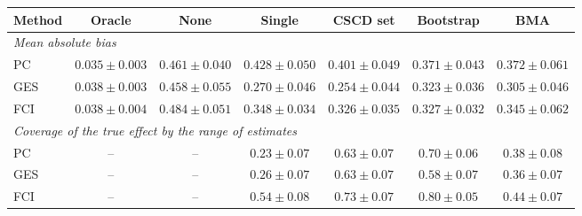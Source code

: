 \begin{tabular}{lcccccc}
\toprule
Method & Oracle & None & Single & CSCD set & Bootstrap & BMA \\
\midrule
\multicolumn{7}{l}{\emph{Mean absolute bias}} \\
PC & $0.035\pm0.003$ & $0.461\pm0.040$ & $0.428\pm0.050$ & $0.401\pm0.049$ & $0.371\pm0.043$ & $0.372\pm0.061$ \\
GES & $0.038\pm0.003$ & $0.458\pm0.055$ & $0.270\pm0.046$ & $0.254\pm0.044$ & $0.323\pm0.036$ & $0.305\pm0.046$ \\
FCI & $0.038\pm0.004$ & $0.484\pm0.051$ & $0.348\pm0.034$ & $0.326\pm0.035$ & $0.327\pm0.032$ & $0.345\pm0.062$ \\
\midrule \multicolumn{7}{l}{\emph{Coverage of the true effect by the range of estimates}} \\
PC & -- & -- & $0.23\pm0.07$ & $0.63\pm0.07$ & $0.70\pm0.06$ & $0.38\pm0.08$ \\
GES & -- & -- & $0.26\pm0.07$ & $0.63\pm0.07$ & $0.58\pm0.07$ & $0.36\pm0.07$ \\
FCI & -- & -- & $0.54\pm0.08$ & $0.73\pm0.07$ & $0.80\pm0.05$ & $0.44\pm0.07$ \\
\bottomrule
\end{tabular}
